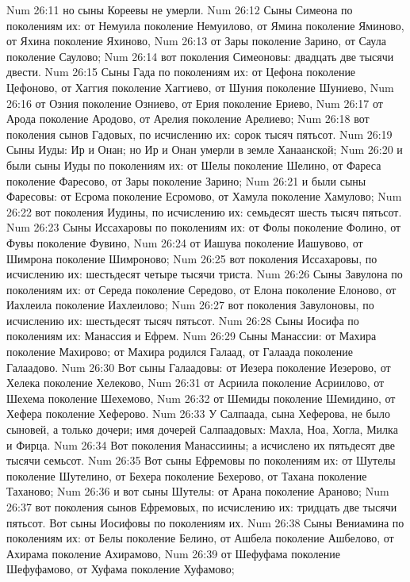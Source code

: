 Num 26:11  но сыны Кореевы не умерли.
Num 26:12  Сыны Симеона по поколениям их: от Немуила поколение Немуилово, от Ямина поколение Яминово, от Яхина поколение Яхиново,
Num 26:13  от Зары поколение Зарино, от Саула поколение Саулово;
Num 26:14  вот поколения Симеоновы: двадцать две тысячи двести.
Num 26:15  Сыны Гада по поколениям их: от Цефона поколение Цефоново, от Хаггия поколение Хаггиево, от Шуния поколение Шуниево,
Num 26:16  от Озния поколение Озниево, от Ерия поколение Ериево,
Num 26:17  от Арода поколение Ародово, от Арелия поколение Арелиево;
Num 26:18  вот поколения сынов Гадовых, по исчислению их: сорок тысяч пятьсот.
Num 26:19  Сыны Иуды: Ир и Онан; но Ир и Онан умерли в земле Ханаанской;
Num 26:20  и были сыны Иуды по поколениям их: от Шелы поколение Шелино, от Фареса поколение Фаресово, от Зары поколение Зарино;
Num 26:21  и были сыны Фаресовы: от Есрома поколение Есромово, от Хамула поколение Хамулово;
Num 26:22  вот поколения Иудины, по исчислению их: семьдесят шесть тысяч пятьсот.
Num 26:23  Сыны Иссахаровы по поколениям их: от Фолы поколение Фолино, от Фувы поколение Фувино,
Num 26:24  от Иашува поколение Иашувово, от Шимрона поколение Шимроново;
Num 26:25  вот поколения Иссахаровы, по исчислению их: шестьдесят четыре тысячи триста.
Num 26:26  Сыны Завулона по поколениям их: от Середа поколение Середово, от Елона поколение Елоново, от Иахлеила поколение Иахлеилово;
Num 26:27  вот поколения Завулоновы, по исчислению их: шестьдесят тысяч пятьсот.
Num 26:28  Сыны Иосифа по поколениям их: Манассия и Ефрем.
Num 26:29  Сыны Манассии: от Махира поколение Махирово; от Махира родился Галаад, от Галаада поколение Галаадово.
Num 26:30  Вот сыны Галаадовы: от Иезера поколение Иезерово, от Хелека поколение Хелеково,
Num 26:31  от Асриила поколение Асриилово, от Шехема поколение Шехемово,
Num 26:32  от Шемиды поколение Шемидино, от Хефера поколение Хеферово.
Num 26:33  У Салпаада, сына Хеферова, не было сыновей, а только дочери; имя дочерей Салпаадовых: Махла, Ноа, Хогла, Милка и Фирца.
Num 26:34  Вот поколения Манассиины; а исчислено их пятьдесят две тысячи семьсот.
Num 26:35  Вот сыны Ефремовы по поколениям их: от Шутелы поколение Шутелино, от Бехера поколение Бехерово, от Тахана поколение Таханово;
Num 26:36  и вот сыны Шутелы: от Арана поколение Араново;
Num 26:37  вот поколения сынов Ефремовых, по исчислению их: тридцать две тысячи пятьсот. Вот сыны Иосифовы по поколениям их.
Num 26:38  Сыны Вениамина по поколениям их: от Белы поколение Белино, от Ашбела поколение Ашбелово, от Ахирама поколение Ахирамово,
Num 26:39  от Шефуфама поколение Шефуфамово, от Хуфама поколение Хуфамово;
